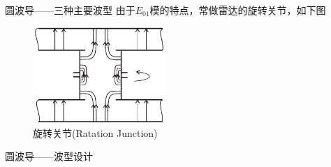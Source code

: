 \begin{frame}{圆波导——三种主要波型}
    由于$E_{01}$模的特点，常做雷达的旋转关节，如下图
    \begin{figure}
        \includegraphics[width=5cm]{Cha6//fig6-28.png}
        \caption{旋转关节(Ratation Junction)}
    \end{figure}
\end{frame}

\begin{frame}{圆波导——波型设计}
    \begin{table}
        \begin{threeparttable}[b]
            \caption{圆波导波型设计}
        \end{threeparttable}
    \end{table}
\end{frame}

